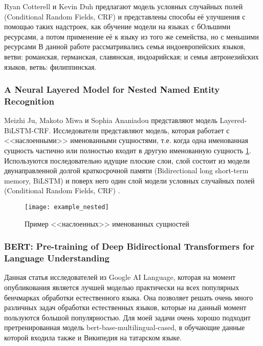 Ryan Cotterell и Kevin Duh  \cite{cotterell-duh-2017-low} предлагают модель условных случайных полей (Conditional Random Fields, CRF) и представлены способы её улучшения с помощью таких надстроек, как обучение модели на языках с бОльшими ресурсами, а потом применение её к языку из того же семейства, но с меньшими ресурсами В данной работе рассматривались семья индоевропейских языков, ветви: романская, германская, славянская, индоарийская; и семья автронезийских языков, ветвь: филиппинская.

\subsubsection{A Neural Layered Model for Nested Named Entity Recognition}

Meizhi Ju, Makoto Miwa и Sophia Ananiadou  \cite{ju-etal-2018-neural} представляют модель Layered-BiLSTM-CRF. Исследователи представляют модель, которая работает с <<наслоенными>> именованными сущностями, т.е. когда одна именованная сущность частично или полностью входит в другую именованную сущность \ref{fig:example_nested}. Используются последовательно идущие плоские слои, слой состоит из модели двунаправленной долгой краткосрочной памяти (Bidirectional long short-term memory, BiLSTM) \cite{DBLP:journals/corr/GreffSKSS15} и поверх него один слой модели условных случайных полей (Conditional Random Fields, CRF) \cite{CRF}. 

\begin{figure}[h]
\caption{Пример <<наслоенных>> именованных сущностей}
\texttt{[image: example\_nested]}
\label{fig:example_nested}
\end{figure}


\subsubsection{BERT: Pre-training of Deep Bidirectional Transformers for
Language Understanding} 

Данная статья исследователей из Google AI Language\cite{DBLP:journals/corr/abs-1810-04805}, которая на момент опубликования является лучшей моделью практически на всех популярных бенчмарках обработки естественного языка. Она позволяет решать очень много различных задач обработки естественных языков, которые на данный момент пользуются большой популярностью. Для моей задачи очень хорошо подходит претренированная модель bert-base-multilingual-cased, в обучающие данные которой входила также и Википедия на татарском языке.

